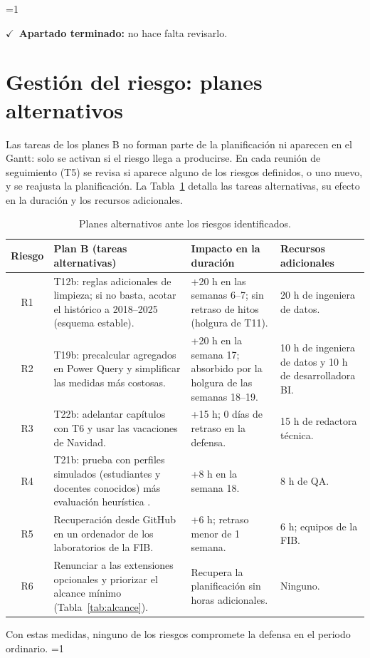 \documentclass[12pt, a4paper, oneside]{report}
\newcommand{\mostrarterminados}{1}
\newenvironment{revisado}
  {\ifnum\mostrarterminados=1\relax\begin{cajarevisada}\noindent\colorbox{verdeterminado}{\parbox{\dimexpr\linewidth-2\fboxsep\relax}{\small$\checkmark$\ \textbf{Apartado terminado:} no hace falta revisarlo.}}\par\medskip\fi}
  {\ifnum\mostrarterminados=1\relax\end{cajarevisada}\fi}
\begin{document}
\begin{revisado}

\section{Gestión del riesgo: planes alternativos}
\label{sec:planesB}
Las tareas de los planes B no forman parte de la planificación ni aparecen en el Gantt: solo se activan si el riesgo llega a producirse. En cada reunión de seguimiento (T5) se revisa si aparece alguno de los riesgos definidos, o uno nuevo, y se reajusta la planificación. La Tabla~\ref{tab:planesB} detalla las tareas alternativas, su efecto en la duración y los recursos adicionales.

\begin{table}[H]
\centering
\small
\renewcommand{\arraystretch}{1.1}
\setlength{\tabcolsep}{3pt}
\begin{tabularx}{\textwidth}{@{} c X p{3.2cm} p{2.8cm} @{}}
\toprule
\textbf{Riesgo} & \textbf{Plan B (tareas alternativas)} & \textbf{Impacto en la duración} & \textbf{Recursos adicionales} \\ \midrule
R1 & T12b: reglas adicionales de limpieza; si no basta, acotar el histórico a 2018--2025 (esquema estable). & +20 h en las semanas 6--7; sin retraso de hitos (holgura de T11). & 20 h de ingeniera de datos. \\ \addlinespace
R2 & T19b: precalcular agregados en Power Query y simplificar las medidas más costosas. & +20 h en la semana 17; absorbido por la holgura de las semanas 18--19. & 10 h de ingeniera de datos y 10 h de desarrolladora BI. \\ \addlinespace
R3 & T22b: adelantar capítulos con T6 y usar las vacaciones de Navidad. & +15 h; 0 días de retraso en la defensa. & 15 h de redactora técnica. \\ \addlinespace
R4 & T21b: prueba con perfiles simulados (estudiantes y docentes conocidos) más evaluación heurística \cite{nielsen1993usability}. & +8 h en la semana 18. & 8 h de QA. \\ \addlinespace
R5 & Recuperación desde GitHub en un ordenador de los laboratorios de la FIB. & +6 h; retraso menor de 1 semana. & 6 h; equipos de la FIB. \\ \addlinespace
R6 & Renunciar a las extensiones opcionales y priorizar el alcance mínimo (Tabla~\ref{tab:alcance}). & Recupera la planificación sin horas adicionales. & Ninguno. \\ \bottomrule
\end{tabularx}
\caption{Planes alternativos ante los riesgos identificados.}
\label{tab:planesB}
\end{table}

Con estas medidas, ninguno de los riesgos compromete la defensa en el periodo ordinario.
\end{revisado}
\end{document}
